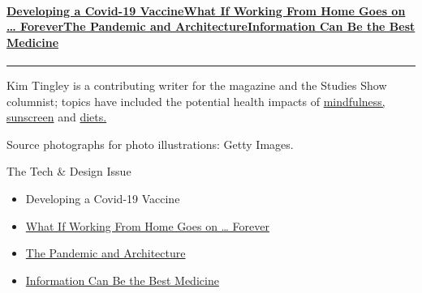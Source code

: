 \hypertarget{developing-a-covid-19-vaccinewhat-if-working-from-home-goes-on--foreverthe-pandemic-and-architectureinformation-can-be-the-best-medicine}{%
\paragraph{\texorpdfstring{\href{https://www.nytimes3xbfgragh.onion/interactive/2020/06/09/magazine/covid-vaccine.html}{Developing
a Covid-19
Vaccine}\href{https://www.nytimes3xbfgragh.onion/interactive/2020/06/09/magazine/remote-work-covid.html}{What
If Working From Home Goes on \ldots{}
Forever}\href{https://www.nytimes3xbfgragh.onion/interactive/2020/06/09/magazine/architecture-covid.html}{The
Pandemic and
Architecture}\href{https://www.nytimes3xbfgragh.onion/interactive/2020/06/10/magazine/covid-data.html}{Information
Can Be the Best
Medicine}}{Developing a Covid-19 VaccineWhat If Working From Home Goes on \ldots{} ForeverThe Pandemic and ArchitectureInformation Can Be the Best Medicine}}\label{developing-a-covid-19-vaccinewhat-if-working-from-home-goes-on--foreverthe-pandemic-and-architectureinformation-can-be-the-best-medicine}}

\begin{center}\rule{0.5\linewidth}{\linethickness}\end{center}

Kim Tingley is a contributing writer for the magazine and the Studies
Show columnist; topics have included the potential health impacts of
\href{https://www.nytimes3xbfgragh.onion/2020/01/22/magazine/can-mindfulness-evolve-from-wellness-pursuit-to-medical-treatment.html}{mindfulness,}
\href{https://www.nytimes3xbfgragh.onion/2019/07/23/magazine/when-you-wear-sunscreen-youre-taking-part-in-a-safety-study.html}{sunscreen}
and
\href{https://www.nytimes3xbfgragh.onion/2019/10/24/magazine/why-isnt-there-a-diet-that-works-for-everyone.html}{diets.}

Source photographs for photo illustrations: Getty Images.

The Tech \& Design Issue

\begin{itemize}
\tightlist
\item
  Developing a Covid-19 Vaccine
\item
  \href{https://www.nytimes3xbfgragh.onion/interactive/2020/06/09/magazine/remote-work-covid.html}{What
  If Working From Home Goes on \ldots{} Forever}
\item
  \href{https://www.nytimes3xbfgragh.onion/interactive/2020/06/09/magazine/architecture-covid.html}{The
  Pandemic and Architecture}
\item
  \href{https://www.nytimes3xbfgragh.onion/interactive/2020/06/10/magazine/covid-data.html}{Information
  Can Be the Best Medicine}
\end{itemize}

